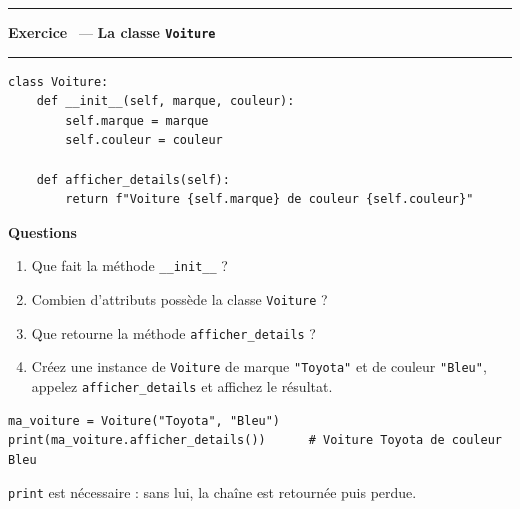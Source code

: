 \documentclass[10pt,a4paper]{article}
\newif\ifcorrige
\newcommand{\py}[1]{\texttt{#1}}
\newcounter{exo}
\newcommand{\exo}[1]{%
  \stepcounter{exo}\par\vspace{4pt}
  \ifcorrige\else\noindent\minipage{\textwidth}\fi
  \noindent\textcolor{qbar}{\rule{2.5pt}{10pt}}\hspace{4pt}%
  \textbf{\color{qbar}Exercice \theexo}\ --- \textbf{#1}%
  \par\nobreak\vspace{-3pt}\noindent\textcolor{qbar!35}{\rule{\textwidth}{0.6pt}}%
  \par\nobreak\vspace{1pt}}
\newenvironment{codebloc}
  {\ifcorrige\else\noindent\minipage[t]{0.50\textwidth}\vspace{0pt}\fi}
  {\ifcorrige\else\endminipage\hfill\fi}
\newenvironment{qbloc}
  {\ifcorrige\else\minipage[t]{0.475\textwidth}\vspace{0pt}\fi
   \textbf{\small Questions}\begin{enumerate}[leftmargin=*,nosep,label=\arabic*.]}
  {\end{enumerate}\ifcorrige\else\endminipage\par\fi}
\newcommand{\rep}[1]{\ifcorrige\par\smallskip{\color{corr}\small#1}\par\smallskip\fi}
\newlength{\zoneadj}\setlength{\zoneadj}{0pt}
\newcommand{\zone}[1][4cm]{%
  \ifcorrige\else
    \par\vspace{2pt}\noindent
    \begin{tcolorbox}[colback=white,colframe=black!45,boxrule=0.5pt,arc=1pt,height={\dimexpr#1-\zoneadj\relax},
      left=4pt,right=4pt,top=2pt,bottom=2pt,
      title={\scriptsize\itshape Réponses},coltitle=black!55,fonttitle=\itshape,
      detach title,before upper={\tcbtitle\par}]\end{tcolorbox}%
    \endminipage\par
  \fi}
\newenvironment{solution}
  {\ifcorrige
     \begin{tcolorbox}[enhanced,breakable,colback=corrbg,colframe=corr,boxrule=0.6pt,arc=1pt,
       left=5pt,right=5pt,top=3pt,bottom=3pt,fontupper=\small,
       title={Corrigé},coltitle=corr,fonttitle=\bfseries\small,detach title,
       before upper={\tcbtitle\par\smallskip}]%
   \else
     \setbox0\vbox\bgroup
   \fi}
  {\ifcorrige\end{tcolorbox}\else\egroup\fi}
\begin{document}
\exo{La classe \py{Voiture}}
\begin{codebloc}
\begin{lstlisting}
class Voiture:
    def __init__(self, marque, couleur):
        self.marque = marque
        self.couleur = couleur

    def afficher_details(self):
        return f"Voiture {self.marque} de couleur {self.couleur}"
\end{lstlisting}
\end{codebloc}
\begin{qbloc}
  \item Que fait la méthode \py{__init__} ?
    \rep{C'est le \textbf{constructeur}. Il est appelé automatiquement à la création de l'objet et
    initialise les attributs d'instance \py{self.marque} et \py{self.couleur} à partir des valeurs
    passées en paramètres.}
  \item Combien d'attributs possède la classe \py{Voiture} ?
    \rep{Deux attributs d'instance : \py{marque} et \py{couleur}.}
  \item Que retourne la méthode \py{afficher_details} ?
    \rep{Une chaîne de caractères (\py{str}) construite par une f-string, par exemple
    \py{"Voiture Toyota de couleur Bleu"}. Elle \emph{retourne} la chaîne, elle ne l'affiche pas.}
  \item Créez une instance de \py{Voiture} de marque \py{"Toyota"} et de couleur \py{"Bleu"},
    appelez \py{afficher_details} et affichez le résultat.
\end{qbloc}
\zone[3.8cm]
\begin{solution}
\begin{lstlisting}
ma_voiture = Voiture("Toyota", "Bleu")
print(ma_voiture.afficher_details())      # Voiture Toyota de couleur Bleu
\end{lstlisting}
\py{print} est nécessaire : sans lui, la chaîne est retournée puis perdue.
\end{solution}
\end{document}
